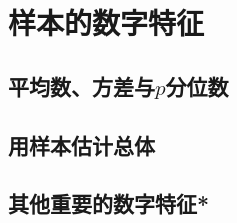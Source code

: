 
\section{样本的数字特征}
\subsection{平均数、方差与\texorpdfstring{$p$}a分位数}
\clearpage
\subsection{用样本估计总体}
\clearpage
\subsection{其他重要的数字特征*}
\clearpage
